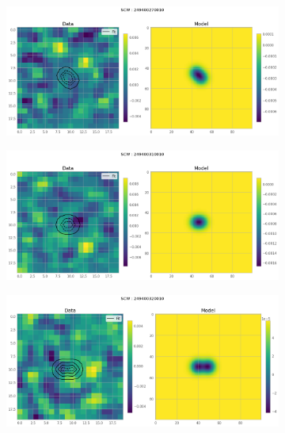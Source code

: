 \documentclass[
	a4paper, %
	10pt, %
	unnumberedsections, %
	twoside, %
]{LTJournalArticle}
\begin{document}
\begin{figure}[H]
\begin{subfigure}{.47\textwidth}
    \end{subfigure}%
    \hspace{1em}
    \begin{subfigure}{.47\textwidth}
        \centering
        \includegraphics[width=\textwidth]{report/Figures/models/2204/27_psf_const.png}
    \end{subfigure}
    \begin{subfigure}{.47\textwidth}
        \centering
        \includegraphics[width=\textwidth]{report/Figures/models/2204/31_psf_const.png}
    \end{subfigure}
    \hspace{1em}
    \begin{subfigure}{.47\textwidth}
        \includegraphics[width=\textwidth]{report/Figures/models/2204/32_psf_const.png}

\end{subfigure}
\end{figure}
\end{document}
